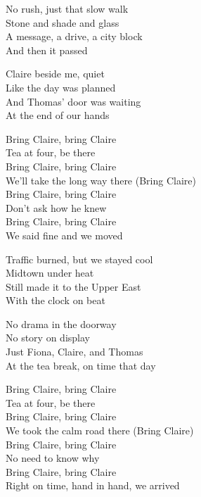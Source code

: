 \begin{lyrics}
No rush, just that slow walk\\
Stone and shade and glass\\
A message, a drive, a city block\\
And then it passed

Claire beside me, quiet\\
Like the day was planned\\
And Thomas’ door was waiting\\
At the end of our hands

Bring Claire, bring Claire\\
Tea at four, be there\\
Bring Claire, bring Claire\\
We’ll take the long way there
(Bring Claire)\\
Bring Claire, bring Claire\\
Don’t ask how he knew\\
Bring Claire, bring Claire\\
We said fine and we moved

Traffic burned, but we stayed cool\\
Midtown under heat\\
Still made it to the Upper East\\
With the clock on beat

No drama in the doorway\\
No story on display\\
Just Fiona, Claire, and Thomas\\
At the tea break, on time that day

Bring Claire, bring Claire\\
Tea at four, be there\\
Bring Claire, bring Claire\\
We took the calm road there
(Bring Claire)\\
Bring Claire, bring Claire\\
No need to know why\\
Bring Claire, bring Claire\\
Right on time, hand in hand, we arrived
\end{lyrics}

